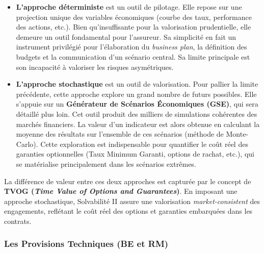 \begin{itemize}
    \item \textbf{L'approche déterministe} est un outil de pilotage. Elle repose sur une projection unique des variables économiques (courbe des taux, performance des actions, etc.). Bien qu'insuffisante pour la valorisation prudentielle, elle demeure un outil fondamental pour l'assureur. Sa simplicité en fait un instrument privilégié pour l'élaboration du \textit{business plan}, la définition des budgets et la communication d'un scénario central. Sa limite principale est son incapacité à valoriser les risques asymétriques.

    \item \textbf{L'approche stochastique} est un outil de valorisation. Pour pallier la limite précédente, cette approche explore un grand nombre de futurs possibles. Elle s'appuie sur un \textbf{Générateur de Scénarios Économiques (GSE)}, qui sera détaillé plus loin. Cet outil produit des milliers de simulations cohérentes des marchés financiers. La valeur d'un indicateur est alors obtenue en calculant la moyenne des résultats sur l'ensemble de ces scénarios (méthode de Monte-Carlo). Cette exploration est indispensable pour quantifier le coût réel des garanties optionnelles (Taux Minimum Garanti, options de rachat, etc.), qui se matérialise principalement dans les scénarios extrêmes.
\end{itemize}

La différence de valeur entre ces deux approches est capturée par le concept de \textbf{TVOG (\textit{Time Value of Options and Guarantees})}. En imposant une approche stochastique, Solvabilité II assure une valorisation \textit{market-consistent} des engagements, reflétant le coût réel des options et garanties embarquées dans les contrats.

\subsubsection{Les Provisions Techniques (BE et RM)}

